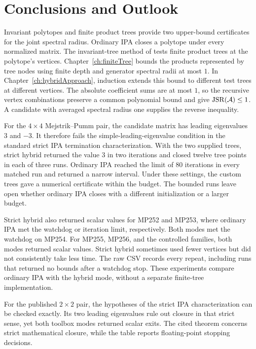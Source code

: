 \chapter{Conclusions and Outlook}
\label{ch:thesisConclusion}

Invariant polytopes and finite product trees provide two upper-bound certificates for the joint spectral radius.
Ordinary IPA closes a polytope under every normalized matrix.
The invariant-tree method of \citet{MejstrikReif2025HybridApproachJSR} tests finite product trees at the polytope's vertices.
Chapter~\ref{ch:finiteTree} bounds the products represented by tree nodes using finite depth and generator spectral radii at most $1$.
In Chapter~\ref{ch:hybridApproach}, induction extends this bound to different test trees at different vertices.
The absolute coefficient sums are at most $1$, so the recursive vertex combinations preserve a common polynomial bound and give $\operatorname{JSR}(\mathcal{A})\leq1$.
A candidate with averaged spectral radius one supplies the reverse inequality.

For the $4\times4$ Mejstrik--Pumm pair, the candidate matrix has leading eigenvalues $3$ and $-3$.
It therefore fails the simple-leading-eigenvalue condition in the standard strict IPA termination characterization.
With the two supplied trees, strict hybrid returned the value $3$ in two iterations and closed twelve tree points in each of three runs.
Ordinary IPA reached the limit of $80$ iterations in every matched run and returned a narrow interval.
Under these settings, the custom trees gave a numerical certificate within the budget.
The bounded runs leave open whether ordinary IPA closes with a different initialization or a larger budget.

Strict hybrid also returned scalar values for MP252 and MP253, where ordinary IPA met the watchdog or iteration limit, respectively.
Both modes met the watchdog on MP254.
For MP255, MP256, and the controlled families, both modes returned scalar values.
Strict hybrid sometimes used fewer vertices but did not consistently take less time.
The raw CSV records every repeat, including runs that returned no bounds after a watchdog stop.
These experiments compare ordinary IPA with the hybrid mode, without a separate finite-tree implementation.

For the published $2\times2$ pair, the hypotheses of the strict IPA characterization can be checked exactly.
Its two leading eigenvalues rule out closure in that strict sense, yet both toolbox modes returned scalar exits.
The cited theorem concerns strict mathematical closure, while the table reports floating-point stopping decisions.

